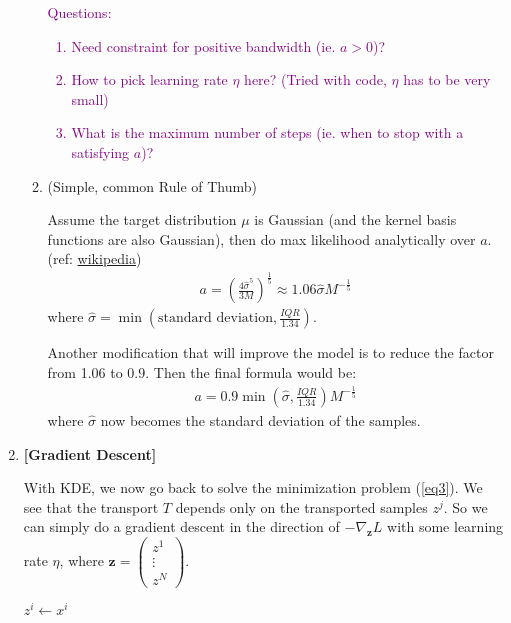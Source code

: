 \documentclass[11pt]{article}
\begin{document}
\begin{enumerate}
\begin{enumerate}
        \textcolor{purple}{
        Questions:
        \begin{enumerate}
            \item Need constraint for positive bandwidth (ie. $a>0$)?
            \item How to pick learning rate $\eta$ here? (Tried with code, $\eta$ has to be very small)
            \item What is the maximum number of steps (ie. when to stop with a satisfying $a$)?
        \end{enumerate}
        }
        
        \item (Simple, common Rule of Thumb)
        
        Assume the target distribution $\mu$ is Gaussian (and the kernel basis functions are also Gaussian), then do max likelihood analytically over $a$. (ref: \href{https://en.wikipedia.org/wiki/Kernel_density_estimation}{wikipedia})
        \begin{align*}
            a = (\frac{4\hat{\sigma}^5}{3M})^{\frac{1}{5}} \approx
            1.06 \hat{\sigma} M^{-\frac{1}{5}}
        \end{align*}
        where $\hat{\sigma} = \min (\text{standard deviation}, \frac{IQR}{1.34})$.
        
        Another modification that will improve the model is to reduce the factor from 1.06 to 0.9. Then the final formula would be:
        \begin{align*}
            a = 0.9 \min (\hat{\sigma}, \frac{IQR}{1.34}) M^{-\frac{1}{5}}
        \end{align*}
        where $\hat{\sigma}$ now becomes the standard deviation of the samples.
    \end{enumerate}
    
    \item {\bf [Gradient Descent]}
    
    With KDE, we now go back to solve the minimization problem (\ref{eq3}).
    We see that the transport $T$ depends only on the transported samples $z^j$. So we can simply do a gradient descent in the direction of $-\nabla_{\mathbf{z}} L$ with some learning rate $\eta$, where $\mathbf{z} = \begin{pmatrix}
    z^1 \\ \vdots \\ z^N
    \end{pmatrix}$.
    
        \begin{algorithm}[h]
        \caption{Gradient Descent w.r.t $\mathbf{z}$}
        \begin{algorithmic}
        \label{algo1}
        \State $z^i \gets x^i$
        \EndFor
            

\end{algorithmic}
\end{algorithm}
\end{enumerate}
\end{document}
